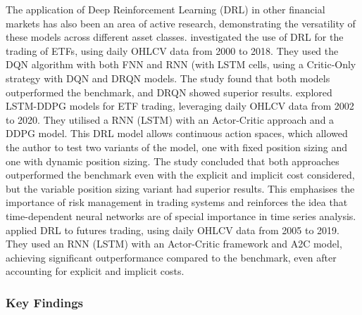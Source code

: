 The application of Deep Reinforcement Learning (DRL) in other financial markets has also been an area of active research, demonstrating the versatility of these models across different asset classes. \cite{chen_application_2019} investigated the use of DRL for the trading of ETFs, using daily OHLCV data from 2000 to 2018. They used the DQN algorithm with both FNN and RNN (with LSTM cells, using a Critic-Only strategy with DQN and DRQN models. The study found that both models outperformed the benchmark, and DRQN showed superior results. \cite{jia_lstm-ddpg_2021} explored LSTM-DDPG models for ETF trading, leveraging daily OHLCV data from 2002 to 2020. They utilised a RNN (LSTM) with an Actor-Critic approach and a DDPG model. This DRL model allows continuous action spaces, which allowed the author to test two variants of the model, one with fixed position sizing and one with dynamic position sizing. The study concluded that both approaches outperformed the benchmark even with the explicit and implicit cost considered, but the variable position sizing variant had superior results. This emphasises the importance of risk management in trading systems and reinforces the idea that time-dependent neural networks are of special importance in time series analysis. \cite{zhang_deep_2020} applied DRL to futures trading, using daily OHLCV data from 2005 to 2019. They used an RNN (LSTM) with an Actor-Critic framework and A2C model, achieving significant outperformance compared to the benchmark, even after accounting for explicit and implicit costs.

\subsubsection{Key Findings}

